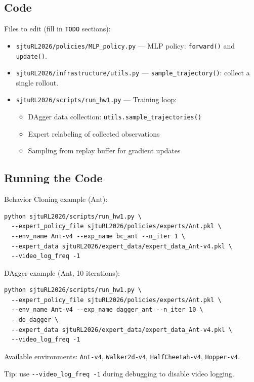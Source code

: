 \documentclass{article}
\begin{document}
\subsection{Code}

Files to edit (fill in \texttt{TODO} sections):
\begin{itemize}
    \item \verb|sjtuRL2026/policies/MLP_policy.py| --- MLP policy: \texttt{forward()} and \texttt{update()}.
    \item \verb|sjtuRL2026/infrastructure/utils.py| --- \texttt{sample\_trajectory()}: collect a single rollout.
    \item \verb|sjtuRL2026/scripts/run_hw1.py| --- Training loop:
    \begin{itemize}
        \item DAgger data collection: \verb|utils.sample_trajectories()|
        \item Expert relabeling of collected observations
        \item Sampling from replay buffer for gradient updates
    \end{itemize}
\end{itemize}

\subsection{Running the Code}

Behavior Cloning example (Ant):
\begin{lstlisting}
python sjtuRL2026/scripts/run_hw1.py \
  --expert_policy_file sjtuRL2026/policies/experts/Ant.pkl \
  --env_name Ant-v4 --exp_name bc_ant --n_iter 1 \
  --expert_data sjtuRL2026/expert_data/expert_data_Ant-v4.pkl \
  --video_log_freq -1
\end{lstlisting}

DAgger example (Ant, 10 iterations):
\begin{lstlisting}
python sjtuRL2026/scripts/run_hw1.py \
  --expert_policy_file sjtuRL2026/policies/experts/Ant.pkl \
  --env_name Ant-v4 --exp_name dagger_ant --n_iter 10 \
  --do_dagger \
  --expert_data sjtuRL2026/expert_data/expert_data_Ant-v4.pkl \
  --video_log_freq -1
\end{lstlisting}

Available environments: \verb|Ant-v4|, \verb|Walker2d-v4|, \verb|HalfCheetah-v4|, \verb|Hopper-v4|.

Tip: use \verb|--video_log_freq -1| during debugging to disable video logging.
\end{document}
